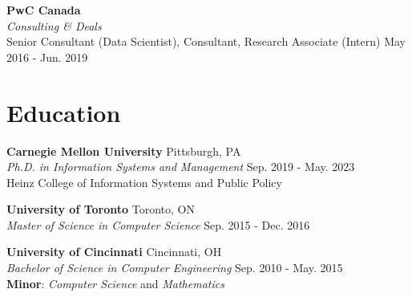 \documentclass[margin,line,pifont,palatino,courier]{res}
\begin{document}
\begin{resume}
\textbf{PwC Canada} \\
\textit{Consulting \& Deals} \\
Senior Consultant (Data Scientist), Consultant, Research Associate (Intern) \hfill May 2016 - Jun. 2019
\vspace{-0.08in}

\section{\sc Education}
\textbf{Carnegie Mellon University} \hfill Pittsburgh, PA \\
\textit{Ph.D. in Information Systems and Management} \hfill Sep. 2019 - May. 2023 \\
Heinz College of Information Systems and Public Policy

\textbf{University of Toronto} \hfill Toronto, ON\\
\textit{Master of Science in Computer Science} \hfill Sep. 2015 - Dec. 2016

\textbf{University of Cincinnati} \hfill Cincinnati, OH\\
\textit{Bachelor of Science in Computer Engineering} \hfill Sep. 2010 - May. 2015 \\
\textbf{Minor}: \textit{Computer Science} and \textit{Mathematics}


\end{resume}
\end{document}
